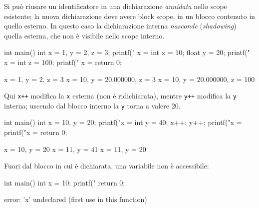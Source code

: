 \documentclass[11pt,a4paper]{article}
\begin{document}
Si può riusare un identificatore in una dichiarazione \emph{annidata} nello
scope esistente; la nuova dichiarazione deve avere block scope, in un blocco
contenuto in quello esterno. In questo caso la dichiarazione interna
\emph{nasconde} (\emph{shadowing}) quella esterna, che non è visibile nello
scope interno.

\begin{esempio}
\begin{codice}
int main() {
    int x = 1, y = 2, z = 3;
    printf(" x = %
    {
        int x = 10;
        float y = 20;
        printf(" x = %
        {
            int z = 100;
            printf(" x = %
        }
    }
    return 0;
}
\end{codice}
\begin{risultato}
x = 1, y = 2, z = 3
x = 10, y = 20.000000, z = 3
x = 10, y = 20.000000, z = 100
\end{risultato}
\end{esempio}

\begin{esempio}
Qui \lstinline|x++| modifica la \lstinline|x| esterna (non è ridichiarata),
mentre \lstinline|y++| modifica la \lstinline|y| interna; uscendo dal blocco
interno la \lstinline|y| torna a valere 20.
\begin{codice}
int main() {
    {
        int x = 10, y = 20;
        {
            printf("x = %
            {
                int y = 40;
                x++;
                y++;
                printf("x = %
            }
            printf("x = %
        }
    }
    return 0;
}
\end{codice}
\begin{risultato}
x = 10, y = 20
x = 11, y = 41
x = 11, y = 20
\end{risultato}
\end{esempio}

\begin{esempio}
Fuori dal blocco in cui è dichiarata, una variabile non è accessibile:
\begin{codice}
int main() {
    {
        int x = 10;
    }
    {
        printf("%
    }
    return 0;
}
\end{codice}
\begin{risultato}
error: 'x' undeclared (first use in this function)
\end{risultato}
\end{esempio}
\end{document}

